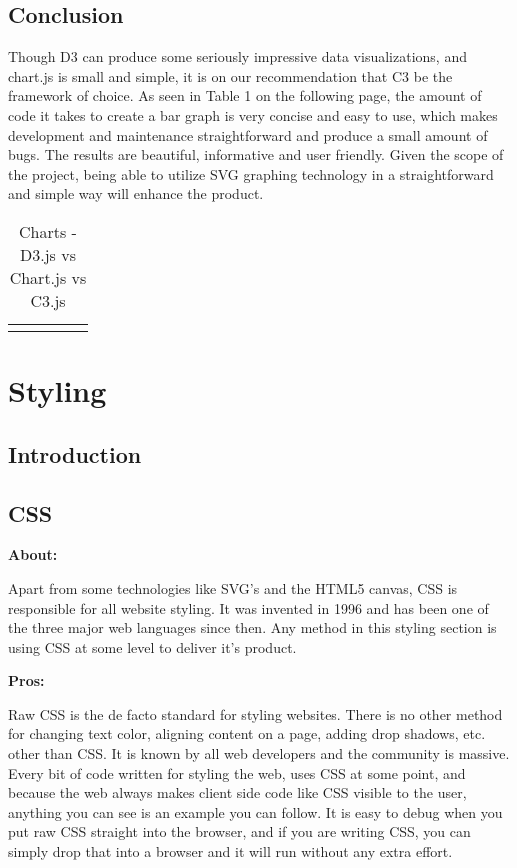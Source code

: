 \documentclass[draftclsnofoot,onecolumn,letterpaper,10pt,compsoc]{IEEEtran}
\begin{document}
  \subsection{Conclusion}

  Though D3 can produce some seriously impressive data visualizations, and chart.js is small and simple, it is on our recommendation that C3 be the framework of choice.
  As seen in Table 1 on the following page, the amount of code it takes to create a bar graph is very concise and easy to use, which makes development and maintenance straightforward and produce a small amount of bugs.
  The results are beautiful, informative and user friendly.
  Given the scope of the project, being able to utilize SVG graphing technology in a straightforward and simple way will enhance the product.


  \begin{landscape}
    \begin{table}[]
    \centering
    \caption{Charts - D3.js vs Chart.js vs C3.js}
    \label{my-label}
      \begin{tabular}{lllll}
        &  &  &  & \\
      \end{tabular}
    \end{table}
  \end{landscape}


\section{Styling}

  \subsection{Introduction}
  \subsection{CSS}

    \textbf{About:}

    Apart from some technologies like SVG's and the HTML5 canvas, CSS is responsible for all website styling.
    It was invented in 1996 and has been one of the three major web languages since then.
    Any method in this styling section is using CSS at some level to deliver it's product.

    \textbf{Pros:}

    Raw CSS is the de facto standard for styling websites.
    There is no other method for changing text color, aligning content on a page, adding drop shadows, etc. other than CSS.
    It is known by all web developers and the community is massive.
    Every bit of code written for styling the web, uses CSS at some point, and because the web always makes client side code like CSS visible to the user, anything you can see is an example you can follow.
    It is easy to debug when you put raw CSS straight into the browser, and if you are writing CSS, you can simply drop that into a browser and it will run without any extra effort.
\end{document}

